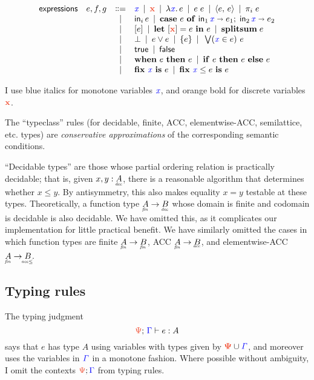 \documentclass{article}
\theoremstyle{plain}
\theoremstyle{definition}
\begin{document}
\[\begin{array}{rccl}
  \textsf{expressions} & e,f,g
  &\bnfeq& \m{x} \pipe \d{x} \pipe \lam{\m{x}} e \pipe e\; e
  \pipe \pair{e}{e} \pipe \pi_i\; e\\
  &&\pipe& \inj{i}{e} \pipe \case{e}{\m{x}}{e_1}{\m{x}}{e_2}\\
  &&\pipe& \disc{e} \pipe \letdisc{\d{x}}{e}{e} \pipe \splitsum{e}\\
  &&\pipe& \unit \pipe e \vee e \pipe \single{e} \pipe \setelim{\m{x}}{e}{e}\\
  &&\pipe& \etrue \pipe \efalse\\
  &&\pipe& \when{e}{e} \pipe \ifthen{e}{e}{e}\\
  &&\pipe& \fix{\m{x}}{e} \pipe \fixle{\m{x}}{e}{e}
\end{array}
\]

I use blue italics for monotone variables $\mathit{{\color{blue}{x}}}$, and orange bold for discrete variables $\d{x}$.

The ``typeclass'' rules (for decidable, finite, ACC, elementwise-ACC, semilattice, etc.\! types) are \emph{conservative approximations} of the corresponding semantic conditions.

``Decidable types'' are those whose partial ordering relation is practically decidable; that is, given $x, y : \eq{A}$, there is a reasonable algorithm that determines whether $x \le y$.
%
By antisymmetry, this also makes equality $x = y$ testable at these types. Theoretically, a function type $\under{fin}{A} \to \eq{B}$ whose domain is finite and codomain is decidable is also decidable.
%
We have omitted this, as it complicates our implementation for little practical
benefit.
%
We have similarly omitted the cases in which function types are finite $\fin{A} \to \fin{B}$, ACC $\fin{A} \to \acc{B}$, and elementwise-ACC $\fin{A} \to \eltacc{B}$.


\subsection{Typing rules}

The typing judgment \[\J{\GP}{\GG}{e}{A}\] says that $e$ has type $A$ using variables with types given by $\d{\GP} \cup \m{\GG}$, and moreover uses the variables in $\mathit{{\color{blue}{\Gamma}}}$ in a monotone fashion.
%
Where possible without ambiguity, I omit the contexts $\dt{\GP};\mt{\GG}$ from typing rules.
\end{document}
